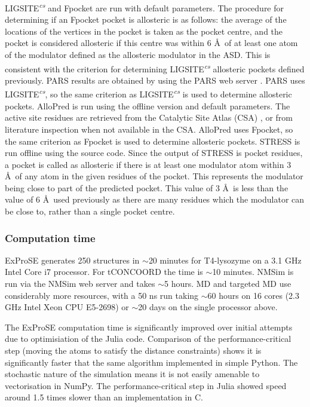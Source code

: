 LIGSITE\textsuperscript{\it cs} \cite{Huang2006} and Fpocket \cite{LeGuilloux2009} are run with default parameters.
The procedure for determining if an Fpocket pocket is allosteric is as follows: the average of the locations of the vertices in the pocket is taken as the pocket centre, and the pocket is considered allosteric if this centre was within 6 \AA\ of at least one atom of the modulator defined as the allosteric modulator in the ASD.
This is consistent with the criterion for determining LIGSITE\textsuperscript{\it cs} allosteric pockets defined previously.
PARS results are obtained by using the PARS web server \cite{Panjkovich2014}.
PARS uses LIGSITE\textsuperscript{\it cs}, so the same criterion as LIGSITE\textsuperscript{\it cs} is used to determine allosteric pockets.
AlloPred is run using the offline version \cite{Greener2015} and default parameters.
The active site residues are retrieved from the Catalytic Site Atlas (CSA) \cite{Furnham2014}, or from literature inspection when not available in the CSA.
AlloPred uses Fpocket, so the same criterion as Fpocket is used to determine allosteric pockets.
STRESS \cite{Clarke2016} is run offline using the source code.
Since the output of STRESS is pocket residues, a pocket is called as allosteric if there is at least one modulator atom within 3 \AA\ of any atom in the given residues of the pocket.
This represents the modulator being close to part of the predicted pocket.
This value of 3 \AA\ is less than the value of 6 \AA\ used previously as there are many residues which the modulator can be close to, rather than a single pocket centre.


\subsubsection{Computation time}

ExProSE generates 250 structures in $\sim$20 minutes for T4-lysozyme on a 3.1 GHz Intel Core i7 processor.
For tCONCOORD the time is $\sim$10 minutes.
NMSim is run via the NMSim web server and takes $\sim$5 hours.
MD and targeted MD use considerably more resources, with a 50 ns run taking $\sim$60 hours on 16 cores (2.3 GHz Intel Xeon CPU E5-2698) or $\sim$20 days on the single processor above.

The ExProSE computation time is significantly improved over initial attempts due to optimisiation of the Julia code.
Comparison of the performance-critical step (moving the atoms to satisfy the distance constraints) shows it is significantly faster that the same algorithm implemented in simple Python.
The stochastic nature of the simulation means it is not easily amenable to vectorisation in NumPy.
The performance-critical step in Julia showed speed around 1.5 times slower than an implementation in C.


